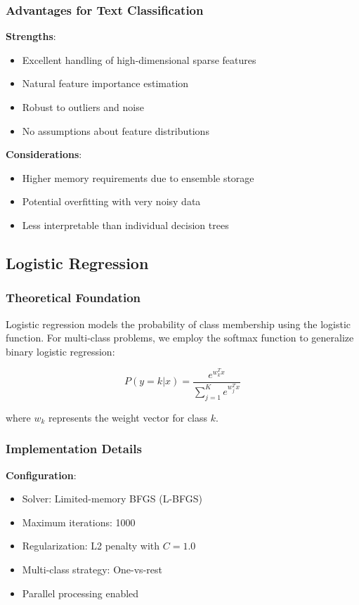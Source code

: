\documentclass[11pt,a4paper]{article}
\begin{document}
\subsubsection{Advantages for Text Classification}

\textbf{Strengths}:
\begin{itemize}
    \item Excellent handling of high-dimensional sparse features
    \item Natural feature importance estimation
    \item Robust to outliers and noise
    \item No assumptions about feature distributions
\end{itemize}

\textbf{Considerations}:
\begin{itemize}
    \item Higher memory requirements due to ensemble storage
    \item Potential overfitting with very noisy data
    \item Less interpretable than individual decision trees
\end{itemize}

\subsection{Logistic Regression}

\subsubsection{Theoretical Foundation}

Logistic regression models the probability of class membership using the logistic function. For multi-class problems, we employ the softmax function to generalize binary logistic regression:

\begin{equation}
P(y=k|x) = \frac{e^{w_k^T x}}{\sum_{j=1}^{K} e^{w_j^T x}}
\end{equation}

where $w_k$ represents the weight vector for class $k$.

\subsubsection{Implementation Details}

\textbf{Configuration}:
\begin{itemize}
    \item Solver: Limited-memory BFGS (L-BFGS)
    \item Maximum iterations: 1000
    \item Regularization: L2 penalty with $C = 1.0$
    \item Multi-class strategy: One-vs-rest
    \item Parallel processing enabled
\end{itemize}
\end{document}

